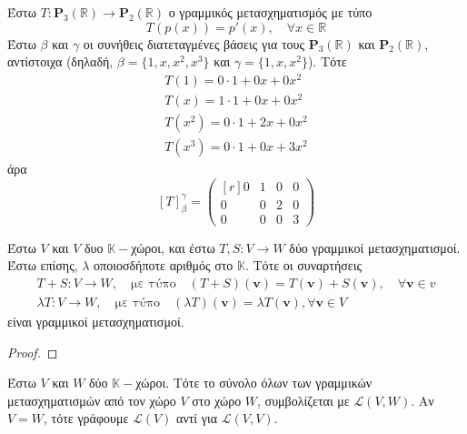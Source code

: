 \begin{example}
  Έστω $ T \colon \textbf{P}_{3}(\mathbb{R}) \to \textbf{P}_{2}(\mathbb{R}) $ ο 
  γραμμικός μετασχηματισμός με τύπο 
  \[
    T(p(x)) = p'(x), \quad \forall x \in \mathbb{R} 
  \]
  Έστω $ \beta $ και $\gamma$ οι συνήθεις διατεταγμένες βάσεις για τους $
  \textbf{P}_{3}(\mathbb{R}) $ και $ \textbf{P}_{2}(\mathbb{R}) $, αντίστοιχα 
  (δηλαδή, $ \beta = \{ 1,x,x^{2},x^{3} \}$ και $\gamma = \{ 1,x,x^{2} \}$). 
  Τότε
  \begin{align*}
    T(1) = 0\cdot 1 +0x +0x^{2} \\
    T(x) = 1 \cdot 1 + 0x + 0x^{2} \\
    T(x^{2}) = 0 \cdot 1 + 2x +0x^{2} \\ 
    T(x^{3}) = 0 \cdot 1 + 0x + 3x^{2}
  \end{align*}
  άρα 
  \[
    [T]_{\beta}^{\gamma} = 
    \begin{pmatrix*}[r]
      0 & 1 & 0 & 0 \\
      0 & 0 & 2 & 0 \\
      0 & 0 & 0 & 3
    \end{pmatrix*}
  \] 
\end{example}

\begin{prop}
  Έστω $V$ και $V$ δυο $ \mathbb{K}- $χώροι, και έστω $ T,S \colon V \to W $ δύο 
  γραμμικοί μετασχηματισμοί. Έστω επίσης, $\lambda$ οποιοσδήποτε αριθμός στο 
  $ \mathbb{K} $. Τότε οι συναρτήσεις
  \begin{gather*}
    T+S \colon V \to W, \quad \text{με τύπο}\quad (T+S)(\mathbf{v}) = 
    T(\mathbf{v}) + S(\mathbf{v}), \quad \forall \mathbf{v} \in v \\
    \lambda T \colon V \to W, \quad \text{με τύπο}\quad (\lambda T)(\mathbf{v}) = 
    \lambda T(\mathbf{v}), \forall \mathbf{v} \in V
  \end{gather*}
  είναι γραμμικοί μετασχηματισμοί.
\end{prop}

\begin{proof}
\end{proof}

\begin{dfn}
  Έστω $V$ και $W$ δύο $ \mathbb{K}- $χώροι. Τότε το σύνολο όλων των γραμμικών
  μετασχηματισμών από τον χώρο $V$ στο χώρο $W$, συμβολίζεται με $ \mathcal{L}(V,W) $. 
  Αν $ V=W $, τότε γράφουμε $ \mathcal{L}(V) $ αντί για $ \mathcal{L}(V,V) $.
\end{dfn}


